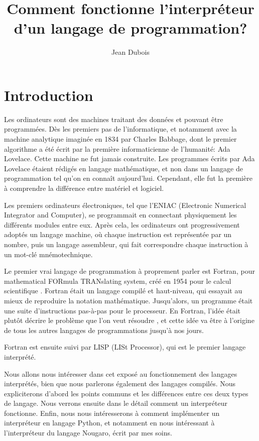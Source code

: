 \documentclass{article}
\title{Comment fonctionne l’interpréteur d’un langage de programmation\nobreakspace?}
\author{Jean Dubois}
\begin{document}
\maketitle

\section{Introduction}
Les ordinateurs sont des machines traitant des données et pouvant être programmées.
Dès les premiers pas de l’informatique, et notamment avec la machine analytique imaginée
en 1834 par Charles Babbage, dont le premier algorithme a été écrit par la première
informaticienne de l’humanité\nobreakspace: Ada Lovelace. Cette machine ne fut jamais
construite. Les programmes écrits par Ada Lovelace étaient rédigés en langage mathématique,
et non dans un langage de programmation tel qu’on en connaît aujourd’hui. Cependant, elle
fut la première à comprendre la différence entre matériel et logiciel. \cite[p. 454]{berry}

Les premiers ordinateurs électroniques, tel que l’ENIAC (Electronic Numerical Integrator and Computer),
se programmait en connectant physiquement les différents modules entre eux. \cite{britannica-eniac}
Après cela, les ordinateurs ont progressivement adoptés un langage machine, où chaque instruction est
représentée par un nombre, puis un langage assembleur, qui fait correspondre chaque instruction à
un mot-clé mnémotechnique. \cite{britannica-asm}

Le premier vrai langage de programmation à proprement parler est Fortran, pour mathematical
FORmula TRANslating system, créé en 1954 pour le calcul scientifique \cite[p. 455]{berry}.
Fortran était un langage compilé et haut-niveau, qui essayait au mieux de reproduire la
notation mathématique. Jusqu’alors, un programme était une suite d’instructions pas-à-pas pour
le processeur. En Fortran, l’idée était plutôt décrire le problème que l’on veut résoudre 
\cite{imb-john-backus}, et
cette idée va être à l’origine de tous les autres langages de programmations jusqu’à nos jours.

Fortran est ensuite suivi par LISP (LISt Processor), qui est le premier langage interprété.

Nous allons nous intéresser dans cet exposé au fonctionnement des langages interprétés,
bien que nous parlerons également des langages compilés. Nous expliciterons d’abord les
points communs et les différences entre ces deux types de langage. Nous verrons ensuite
dans le détail comment un interpréteur fonctionne. Enfin, nous nous intéresserons à
comment implémenter un interpréteur en langage Python, et notamment en nous intéressant
à l’interpréteur du langage Nougaro, écrit par mes soins.
\end{document}
